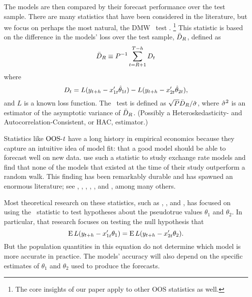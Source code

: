 \documentclass[12pt]{article}
\begin{document}
The models are then compared by their forecast performance over the test
sample. There are many statistics that have been considered in the
literature, but we focus on perhaps the most natural, the DMW \oost\
test \citep{DiM:95,Wes:96}.%
\footnote{The core insights of our paper apply to other OOS statistics
  as well.} %
This statistic is based on
the difference in the models' loss over the test sample, $\bar{D}_{R}$,
defined as
\begin{equation*}
  \bar{D}_{R} \equiv P^{-1} \sum_{t=R+1}^{T-h} D_t
\end{equation*}
where
\begin{equation*}
  D_t = L(y_{t+h} - x_{1t}'\hat\theta_{1t}) - L(y_{t+h} - x_{2t}'\hat\theta_{2t}),
\end{equation*}
and $L$ is a known loss function. The \oost\ test is defined as
$\sqrt{P} \bar{D}_{R} / \hat{\sigma}$, where $\hat{\sigma}^2$ is an estimator of the
asymptotic variance of $\bar{D}_{R}$. (Possibly a Heteroskedasticity- and
Autocorrelation-Consistent, or HAC, estimator.)

Statistics like $\operatorname{OOS-\mathit{t}}$ have a long history in empirical economics
because they capture an intuitive idea of model fit: that a good model
should be able to forecast well on new data. \cite{MeR:83}
use such a statistic to study exchange rate models and find that none
of the models that existed at the time of their study outperform a
random walk. This finding has been remarkably durable and has spawned
an enormous literature; see \cite{Mar:95}, \cite{KiT:03},
\cite{CCP:05}, \cite{EnW:05}, \cite{Ros:05}, and \cite{BWB:10}, among
many others.

Most theoretical research on these statistics, such as \citet{DiM:95}, \citet{Wes:96},
and \cite{Mcc:07}, has focused on using the \oost\ statistic to test
hypotheses about the pseudotrue values $\theta_1$ and $\theta_2$.  In
particular, that research focuses on testing the null hypothesis that
\begin{equation*}
  \operatorname{E} L(y_{t+h} - x_{1t}'\theta_{1}) = \operatorname{E} L(y_{t+h} - x_{2t}'\theta_{2}).
\end{equation*}
But the population quantities in this equation do not determine which
model is more accurate in practice. The models'
accuracy will also depend on the specific estimates of $\theta_1$ and
$\theta_2$ used to produce the forecasts.
\end{document}
